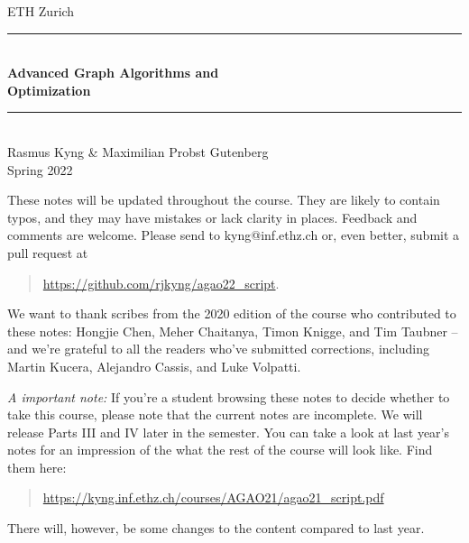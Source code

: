 \documentclass[12pt,a4paper,openany]{book}
\begin{document}
%
%
\begin{titlepage}

\newcommand{\HRule}{\rule{\linewidth}{0.5mm}} %
{\center

{\Large ETH Zurich}\\[1.5cm]
\HRule \\[0.4cm]
{ \huge \bfseries Advanced Graph Algorithms and \\ Optimization}\\[0.4cm] %
\HRule \\[1.5cm]

{\LARGE Rasmus Kyng \& Maximilian Probst Gutenberg}\\[2cm]


{\Large Spring 2022}\\[2cm] %

}
\vfill




\end{titlepage}

These notes will be updated throughout the course.
They are likely to contain typos, and they may have mistakes or
lack clarity in places. Feedback and comments are 
welcome. Please send to kyng@inf.ethz.ch or, even better, submit a pull request at
\begin{quote}
  \url{https://github.com/rjkyng/agao22_script}.
\end{quote}


We want to thank scribes from the 2020 edition of the course who
contributed to these notes: Hongjie
Chen, Meher Chaitanya, Timon Knigge, and Tim Taubner -- and we're
grateful to all the readers who've submitted corrections, including
Martin Kucera, Alejandro Cassis, and Luke Volpatti.

\emph{A important note:} If you're a student browsing these notes to
decide whether to take this course, please note that the current notes
are incomplete. We will release Parts III and IV later in the
semester.
You can take a look at last year's notes for an impression of the
what the rest of the course will look like. Find them here:
\begin{quote}
  \url{https://kyng.inf.ethz.ch/courses/AGAO21/agao21_script.pdf}
\end{quote}
There will, however, be some changes to the content compared to last year.
\end{document}
